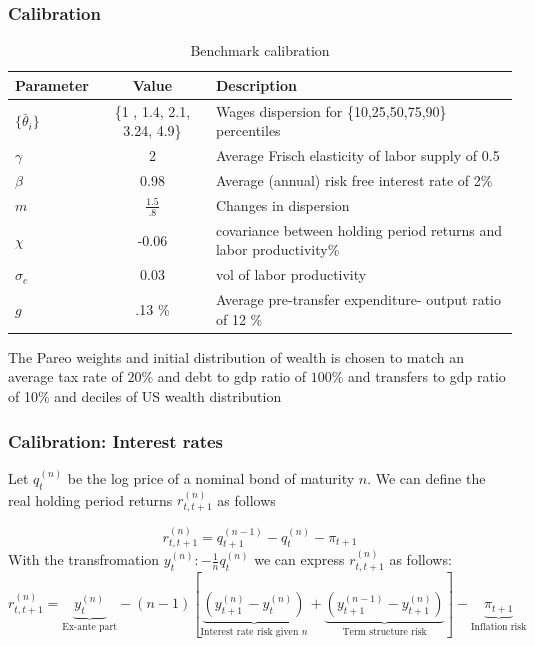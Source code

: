 \documentclass{beamer}
\begin{document}
\begin{frame}
\frametitle{Calibration}

\begin{table}[htp]
\small
\begin{tabular}{|l|c|p{4cm}|}
\hline
Parameter & Value & Description   \\ \hline
$\{\bar{\theta}_i\} $ & \{1 ,  1.4,  2.1,  3.24,  4.9\} & Wages dispersion for \{10,25,50,75,90\} percentiles   \\
$\gamma$ & 2 & Average Frisch elasticity of labor supply of 0.5 \\
$\beta$ & 0.98  &Average (annual) risk free interest rate of 2\%   \\
$m$ &$\frac{1.5}{.8}$& Changes in dispersion \\
$\chi$ & -0.06 &covariance between holding period returns and labor productivity\% \\
$\sigma_e$ & 0.03 & vol of labor productivity\\
$g$ & .13 \%&Average pre-transfer expenditure- output ratio of 12 \% \\\hline
\end{tabular}
\caption{Benchmark calibration}
\label{tab:Parameters}
\end{table}
\small
The Pareo weights and initial distribution of wealth is chosen to match an average tax rate of $20\%$ and debt to gdp ratio of $100\%$ and transfers to gdp ratio of 10\% and deciles of US wealth distribution
\end{frame}
\begin{frame}
 \frametitle{Calibration: Interest rates}
 Let $q^{(n)}_t$ be the log price of a nominal bond of maturity $n$. We can define the real holding period returns $r^{(n)}_{t,t+1}$ as follows
 
 \[r^{(n)}_{t,t+1}= q^{(n-1)}_{t+1}-q_t^{(n)}-\pi_{t+1}\]
 With the transfromation $y^{(n)}_t: -\frac{1}{n} q^{(n)}_t$ we can express $r^{(n)}_{t,t+1}$ as follows:
 \small
 \[r^{(n)}_{t,t+1}=\underbrace{y^{(n)}_t}_{\text{Ex-ante part}} - (n-1)\left[\underbrace{\left(y^{(n)}_{t+1}-y^{(n)}_{t}\right)}_{\text{Interest rate risk given $n$}}+\underbrace{\left(y^{(n-1)}_{t+1}-y^{(n)}_{t+1}\right)}_{\text{Term structure risk}}\right]-\underbrace{\pi_{t+1}}_{\text{Inflation risk}}\]
\end{frame}
\end{document}
